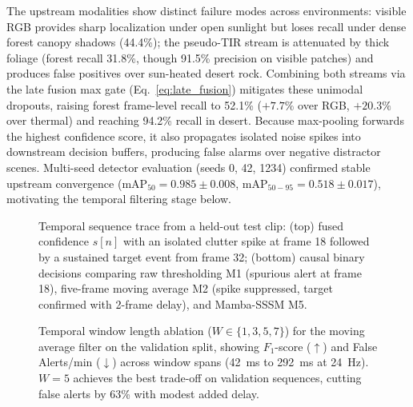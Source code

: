 \documentclass[conference]{IEEEtran}
\begin{document}
The upstream modalities show distinct failure modes across environments: visible RGB provides sharp localization under open sunlight but loses recall under dense forest canopy shadows (44.4\%); the pseudo-TIR stream is attenuated by thick foliage (forest recall 31.8\%, though 91.5\% precision on visible patches) and produces false positives over sun-heated desert rock. Combining both streams via the late fusion max gate (Eq.~\eqref{eq:late_fusion}) mitigates these unimodal dropouts, raising forest frame-level recall to 52.1\% ($+7.7\%$ over RGB, $+20.3\%$ over thermal) and reaching 94.2\% recall in desert. Because max-pooling forwards the highest confidence score, it also propagates isolated noise spikes into downstream decision buffers, producing false alarms over negative distractor scenes. Multi-seed detector evaluation (seeds 0, 42, 1234) confirmed stable upstream convergence ($\text{mAP}_{50} = 0.985 \pm 0.008$, $\text{mAP}_{50-95} = 0.518 \pm 0.017$), motivating the temporal filtering stage below.

\begin{figure}[!t]
\centering

\caption{Temporal sequence trace from a held-out test clip: (top) fused confidence $s[n]$ with an isolated clutter spike at frame 18 followed by a sustained target event from frame 32; (bottom) causal binary decisions comparing raw thresholding M1 (spurious alert at frame 18), five-frame moving average M2 (spike suppressed, target confirmed with 2-frame delay), and Mamba-SSSM M5.}
\label{fig:real_temporal_sequence}
\end{figure}
\begin{figure}[!t]
\centering

\caption{Temporal window length ablation ($W \in \{1, 3, 5, 7\}$) for the moving average filter on the validation split, showing $F_1$-score ($\uparrow$) and False Alerts/min ($\downarrow$) across window spans (42~ms to 292~ms at 24~Hz). $W = 5$ achieves the best trade-off on validation sequences, cutting false alerts by 63\% with modest added delay.}
\label{fig:window_ablation}
\end{figure}
\end{document}
